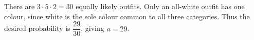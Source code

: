 There are $3\cdot5\cdot2=30$ equally likely outfits. Only an all-white outfit has one colour, since white is the sole colour common to all three categories. Thus the desired probability is $\dfrac{29}{30}$, giving $\boxed{a=29}$.
